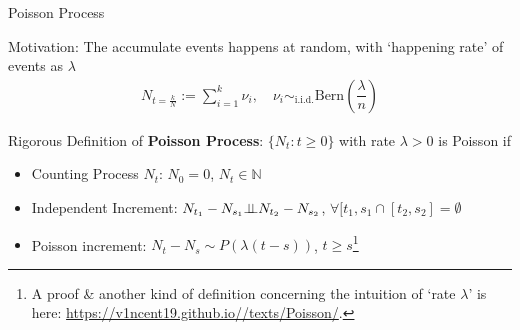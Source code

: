 \begin{point}
    Poisson Process\hypertarget{PoissonProcess}{}
\end{point}

Motivation: The accumulate events happens at random, with `happening rate' of events as $ \lambda  $
\begin{align*}
    N_{t=\frac{k}{N}}:= \sum_{i=1}^k \nu  _i,\quad \nu  _i\sim_{\mathrm{i.i.d.} } \mathrm{Bern}(\dfrac{\lambda }{n}) 
\end{align*}

Rigorous Definition of \textbf{Poisson Process}: $ \{N_t:t\geq 0\} $ with rate $ \lambda >0 $ is Poisson if 
\begin{itemize}[topsep=2pt,itemsep=0pt]
    \item Counting Process $ N_t $: $ N_0=0 $, $ N_t\in\mathbb{N} $
    \item Independent Increment: $ N_{t_1}-N_{s_1}\bot\!\!\!\bot N_{t_2}-N_{s_2} $, $ \forall [t_1,s_1\cap [t_2,s_2]=\emptyset $
    \item Poisson increment: $ N_t-N_s\sim P\left(\lambda (t-s)\right) $, $ t\geq s $\footnote{A proof \& another kind of definition concerning the intuition of `rate $ \lambda  $' is here: \url{https://v1ncent19.github.io//texts/Poisson/}.}
\end{itemize}

